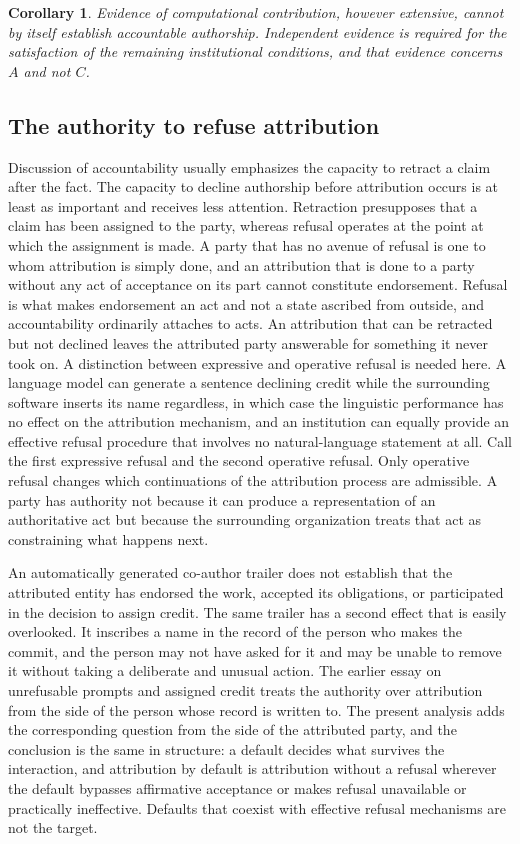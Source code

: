 \documentclass[12pt]{article}
\theoremstyle{definition}
\theoremstyle{plain}
\newtheorem{corollary}{Corollary}
\begin{document}
\begin{corollary}
Evidence of computational contribution, however extensive, cannot by itself establish accountable authorship. Independent evidence is required for the satisfaction of the remaining institutional conditions, and that evidence concerns $A$ and not $C$.
\end{corollary}

\subsection{The authority to refuse attribution}

Discussion of accountability usually emphasizes the capacity to retract a claim after the fact. The capacity to decline authorship before attribution occurs is at least as important and receives less attention. Retraction presupposes that a claim has been assigned to the party, whereas refusal operates at the point at which the assignment is made. A party that has no avenue of refusal is one to whom attribution is simply done, and an attribution that is done to a party without any act of acceptance on its part cannot constitute endorsement. Refusal is what makes endorsement an act and not a state ascribed from outside, and accountability ordinarily attaches to acts. An attribution that can be retracted but not declined leaves the attributed party answerable for something it never took on. A distinction between expressive and operative refusal is needed here. A language model can generate a sentence declining credit while the surrounding software inserts its name regardless, in which case the linguistic performance has no effect on the attribution mechanism, and an institution can equally provide an effective refusal procedure that involves no natural-language statement at all. Call the first expressive refusal and the second operative refusal. Only operative refusal changes which continuations of the attribution process are admissible. A party has authority not because it can produce a representation of an authoritative act but because the surrounding organization treats that act as constraining what happens next.

An automatically generated co-author trailer does not establish that the attributed entity has endorsed the work, accepted its obligations, or participated in the decision to assign credit. The same trailer has a second effect that is easily overlooked. It inscribes a name in the record of the person who makes the commit, and the person may not have asked for it and may be unable to remove it without taking a deliberate and unusual action. The earlier essay on unrefusable prompts and assigned credit \cite{flyxion-credit} treats the authority over attribution from the side of the person whose record is written to. The present analysis adds the corresponding question from the side of the attributed party, and the conclusion is the same in structure: a default decides what survives the interaction, and attribution by default is attribution without a refusal wherever the default bypasses affirmative acceptance or makes refusal unavailable or practically ineffective. Defaults that coexist with effective refusal mechanisms are not the target.
\end{document}
